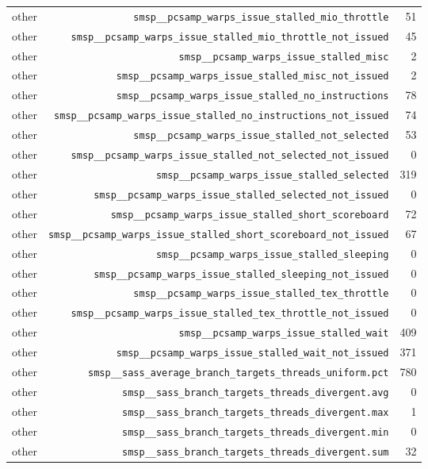 \begin{table}[h]
\begin{tabular}{|l|r|r|}
other & \texttt{smsp__pcsamp_warps_issue_stalled_mio_throttle} & 51 \\
other & \texttt{smsp__pcsamp_warps_issue_stalled_mio_throttle_not_issued} & 45 \\
other & \texttt{smsp__pcsamp_warps_issue_stalled_misc} & 2 \\
other & \texttt{smsp__pcsamp_warps_issue_stalled_misc_not_issued} & 2 \\
other & \texttt{smsp__pcsamp_warps_issue_stalled_no_instructions} & 78 \\
other & \texttt{smsp__pcsamp_warps_issue_stalled_no_instructions_not_issued} & 74 \\
other & \texttt{smsp__pcsamp_warps_issue_stalled_not_selected} & 53 \\
other & \texttt{smsp__pcsamp_warps_issue_stalled_not_selected_not_issued} & 0 \\
other & \texttt{smsp__pcsamp_warps_issue_stalled_selected} & 319 \\
other & \texttt{smsp__pcsamp_warps_issue_stalled_selected_not_issued} & 0 \\
other & \texttt{smsp__pcsamp_warps_issue_stalled_short_scoreboard} & 72 \\
other & \texttt{smsp__pcsamp_warps_issue_stalled_short_scoreboard_not_issued} & 67 \\
other & \texttt{smsp__pcsamp_warps_issue_stalled_sleeping} & 0 \\
other & \texttt{smsp__pcsamp_warps_issue_stalled_sleeping_not_issued} & 0 \\
other & \texttt{smsp__pcsamp_warps_issue_stalled_tex_throttle} & 0 \\
other & \texttt{smsp__pcsamp_warps_issue_stalled_tex_throttle_not_issued} & 0 \\
other & \texttt{smsp__pcsamp_warps_issue_stalled_wait} & 409 \\
other & \texttt{smsp__pcsamp_warps_issue_stalled_wait_not_issued} & 371 \\
other & \texttt{smsp__sass_average_branch_targets_threads_uniform.pct} & 780 \\
other & \texttt{smsp__sass_branch_targets_threads_divergent.avg} & 0 \\
other & \texttt{smsp__sass_branch_targets_threads_divergent.max} & 1 \\
other & \texttt{smsp__sass_branch_targets_threads_divergent.min} & 0 \\
other & \texttt{smsp__sass_branch_targets_threads_divergent.sum} & 32 \\

\end{tabular}
\end{table}
